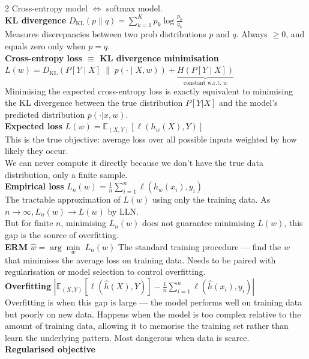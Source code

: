 \documentclass[10pt]{article}
\begin{document}
\begin{multicols*}{2}
Cross-entropy model $\iff$ softmax model.\\
\textbf{KL divergence}
$D_{\text{KL}}(p \| q) = \sum_{k=1}^{K} p_k \log \frac{p_k}{q_k}$\\
Measures discrepancies between two prob distributions $p$ and $q$. Always $\geq 0$, and equals zero only when $p=q$.\\
\textbf{Cross-entropy loss $\equiv$ KL divergence minimisation}\\
$L(w) = D_{\text{KL}}\!\left(P[Y \mid X] \;\|\; p(\cdot \mid X, w)\right) + \underbrace{H(P[Y \mid X])}_{\text{constant w.r.t. } w}$\\
Minimising the expected cross-entropy loss is exactly equivalent to minimising the KL divergence between the true distribution $P[Y|X]$ and the model's predicted distribution $p(\cdot | x, w)$.\\
\vspace{1em}
\textbf{Expected loss}
$L(w) = \mathbb{E}_{(X,Y)}\left[\ell(h_w(X), Y)\right]$\\
This is the true objective: average loss over all possible inputs weighted by how likely they occur.\\
We can never compute it directly because we don't have the true data distribution, only a finite sample.\\
\textbf{Empirical loss}
$L_n(w) = \frac{1}{n} \sum_{i=1}^{n} \ell(h_w(x_i), y_i)$\\
The tractable approximation of $L(w)$ using only the training data. As $n\to\infty, L_n(w)\to L(w)$ by LLN.\\
But for finite $n$, minimising $L_n(w)$ does not guarantee minimising $L(w)$, this gap is the source of overfitting.\\
\textbf{ERM}
$\hat{w} = \arg\min\limits_{w} \; L_n(w)$
The standard training procedure — find the $w$ that minimises the average loss on training data.
Needs to be paired with regularisation or model selection to control overfitting.\\
\textbf{Overfitting}
$\left| \mathbb{E}_{(X,Y)}\left[\ell(\hat{h}(X), Y)\right] - \frac{1}{n}\sum_{i=1}^{n} \ell(\hat{h}(x_i), y_i) \right|$\\
Overfitting is when this gap is large — the model performs well on training data but poorly on new data.
Happens when the model is too complex relative to the amount of training data, allowing it to memorise the training set rather than learn the underlying pattern.
Most dangerous when data is scarce.\\
\textbf{Regularised objective}

\end{multicols*}
\end{document}
